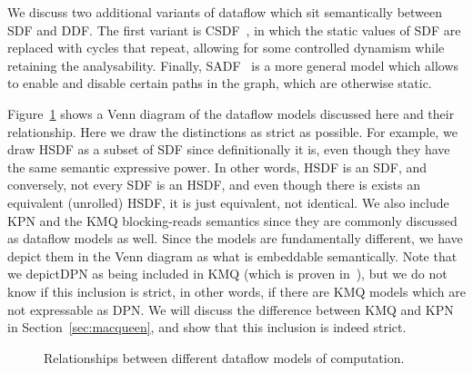 We discuss two additional variants of dataflow which sit semantically between \ac{SDF} and \ac{DDF}. 
The first variant is \ac{CSDF}~\cite{bilsen1996cycle}, in which the static values of \ac{SDF} are replaced with cycles that repeat, allowing for some controlled dynamism while retaining the analysability.
Finally, \ac{SADF}~\cite{theelen2006scenario} is a more general model which allows to enable and disable certain paths in the graph, which are otherwise static.

Figure~\ref{fig:dataflow_mocs} shows a Venn diagram of the dataflow models discussed here and their relationship.
Here we draw the distinctions as strict as possible.
For example, we draw \ac{HSDF} as a subset of \ac{SDF} since definitionally it is, even though they have the same semantic expressive power.
In other words, \ac{HSDF} is an \ac{SDF}, and conversely, not every \ac{SDF} is an \ac{HSDF}, and even though there is exists an equivalent (unrolled) \ac{HSDF}, it is just equivalent, not identical.
We also include \ac{KPN} and the \ac{KMQ} blocking-reads semantics since they are commonly discussed as dataflow models as well.
Since the models are fundamentally different, we have depict them in the Venn diagram as what is embeddable semantically.
Note that we depict\ac{DPN} as being included in \ac{KMQ} (which is proven in~\cite{lee_matsikoudis_semantics}), but we do not know if this inclusion is strict, in other words, if there are \ac{KMQ} models which are not expressable as \ac{DPN}.
We will discuss the difference between \ac{KMQ} and \ac{KPN} in Section~\ref{sec:macqueen}, and show that this inclusion is indeed strict.

\begin{figure}[h]
	\centering
   \resizebox{0.55\textwidth}{!}{}
	\caption{Relationships between different dataflow models of computation.}
	\label{fig:dataflow_mocs}
\end{figure}